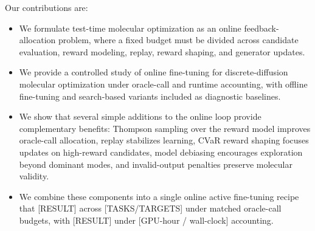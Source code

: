 Our contributions are:
\begin{itemize}
    \item We formulate test-time molecular optimization as an online feedback-allocation problem, where a fixed budget must be divided across candidate evaluation, reward modeling, replay, reward shaping, and generator updates.

    \item We provide a controlled study of online fine-tuning for discrete-diffusion molecular optimization under oracle-call and runtime accounting, with offline fine-tuning and search-based variants included as diagnostic baselines.

    \item We show that several simple additions to the online loop provide complementary benefits: Thompson sampling over the reward model improves oracle-call allocation, replay stabilizes learning, CVaR reward shaping focuses updates on high-reward candidates, model debiasing encourages exploration beyond dominant modes, and invalid-output penalties preserve molecular validity.

    \item We combine these components into a single online active fine-tuning recipe that [RESULT] across [TASKS/TARGETS] under matched oracle-call budgets, with [RESULT] under [GPU-hour / wall-clock] accounting.
\end{itemize}